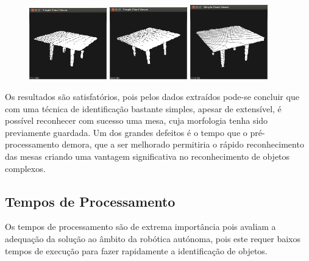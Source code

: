 \begin{figure}[htb]
\begin{center}
	\includegraphics[width=0.30\textwidth]{figures/mesa3_1.png}
	\includegraphics[width=0.30\textwidth]{figures/mesa3_2.png}
	\includegraphics[width=0.30\textwidth]{figures/mesa3_3.png}
	\label{fig:mesa3_ensaios}
\end{center}
\end{figure}



Os resultados são satisfatórios, pois pelos dados extraídos pode-se concluir que com uma técnica de identificação bastante simples, apesar de extensível, é possível reconhecer com sucesso uma mesa, cuja morfologia tenha sido previamente guardada.
Um dos grandes defeitos é o tempo que o pré-processamento demora, que a ser melhorado permitiria o rápido reconhecimento das mesas criando uma vantagem significativa no reconhecimento de objetos complexos.


\subsection{Tempos de Processamento}

Os tempos de processamento são de extrema importância pois avaliam a adequação da solução ao âmbito da robótica autónoma, pois este requer baixos tempos de execução para fazer rapidamente a identificação de objetos.


